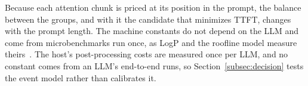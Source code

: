 Because each attention chunk is priced at its position in the prompt, the balance between the groups, and with it the candidate that minimizes TTFT, changes with the prompt length.
The machine constants do not depend on the LLM and come from microbenchmarks run once, as LogP and the roofline model measure theirs~\citep{culler1993logp,williams2009roofline}.
The host's post-processing costs are measured once per LLM, and no constant comes from an LLM's end-to-end runs, so Section~\ref{subsec:decision} tests the event model rather than calibrates it.

